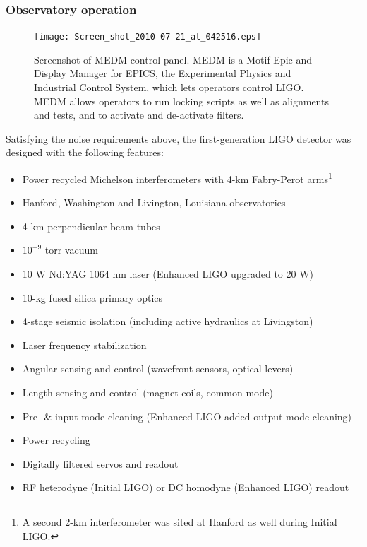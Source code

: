             \subsubsection{Observatory operation}
            \label{observatory_operation}

	\begin{figure}
	\begin{center}
	\texttt{[image: Screen\_shot\_2010-07-21\_at\_042516.eps]}
	\caption{Screenshot of MEDM control panel. MEDM is a Motif Epic and Display Manager for EPICS, the Experimental Physics and Industrial Control System, which lets operators control LIGO. MEDM allows operators to run locking scripts as well as alignments and tests, and to activate and de-activate filters.}
	\label{ScreenshotMEDM}
	\end{center}
	\end{figure}

Satisfying the noise requirements above, the first-generation LIGO detector was designed with the following features:

\begin{itemize}
\item Power recycled Michelson interferometers with 4-km Fabry-Perot arms\footnote{A second 2-km interferometer was sited at Hanford as well during Initial LIGO.}
\item Hanford, Washington and Livington, Louisiana observatories
\item 4-km perpendicular beam tubes
\item $10^{−9}$ torr vacuum
\item 10 W Nd:YAG 1064 nm laser (Enhanced LIGO upgraded to 20 W)
\item 10-kg fused silica primary optics
\item 4-stage seismic isolation (including active hydraulics at Livingston)
\item Laser frequency stabilization
\item Angular sensing and control (wavefront sensors, optical levers)
\item Length sensing and control (magnet coils, common mode)
\item Pre- \& input-mode cleaning (Enhanced LIGO added output mode cleaning)
\item Power recycling
\item Digitally filtered servos and readout
\item RF heterodyne (Initial LIGO) or DC homodyne (Enhanced LIGO) readout
\end{itemize}

